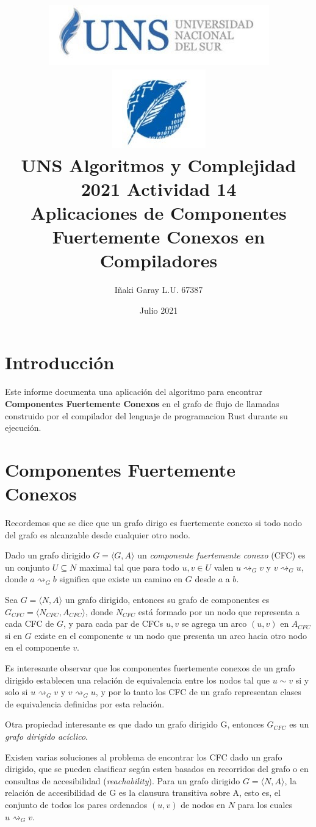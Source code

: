 \documentclass[12pt, a4paper]{article}
\title{
    \includegraphics[height=0.2\textwidth]{uns-logo}
    \includegraphics[height=0.2\textwidth]{dcic-logo} \\
    UNS Algoritmos y Complejidad 2021 Actividad 14 \\
    \large{Aplicaciones de Componentes Fuertemente Conexos en Compiladores}
    }
\author{Iñaki Garay L.U. 67387}
\date{Julio 2021}
\begin{document}
\maketitle


\section{Introducción}

Este informe documenta una aplicación del algoritmo para encontrar \textbf{Componentes Fuertemente Conexos} en el grafo de flujo de llamadas construido por el compilador del lenguaje de programacion Rust durante su ejecución.

\section{Componentes Fuertemente Conexos}

Recordemos que se dice que un grafo dirigo es fuertemente conexo si todo nodo del grafo es alcanzable desde cualquier otro nodo.

Dado un grafo dirigido $G = \langle G, A \rangle$ un \textit{componente fuertemente conexo} (CFC) es un conjunto $U \subseteq N$ maximal tal que para todo $u, v \in U$ valen $u \rightsquigarrow_{G} v$ y $v \rightsquigarrow_{G} u$, donde $a \rightsquigarrow_{G} b$ significa que existe un camino en $G$ desde $a$ a $b$.

Sea $G = \langle N,A \rangle$ un grafo dirigido, entonces su grafo de componentes es $G_{CFC} = \langle N_{CFC}, A_{CFC} \rangle$, donde $N_{CFC}$ está formado por un nodo que representa a cada CFC de $G$, y para cada par de CFCs $u, v$ se agrega un arco $(u,v)$ en $A_{CFC}$ si en $G$ existe en el componente $u$ un nodo que presenta un arco hacia otro nodo en el componente $v$.

Es interesante observar que los componentes fuertemente conexos de un grafo dirigido establecen una relación de equivalencia entre los nodos tal que $u \sim v$ si y solo si $u \rightsquigarrow_{G} v$ y $v \rightsquigarrow_{G} u$, y por lo tanto los CFC de un grafo representan clases de equivalencia definidas por esta relación.

Otra propiedad interesante es que dado un grafo dirigido G, entonces $G_{CFC}$ es un \textit{grafo dirigido acíclico}.

Existen varias soluciones al problema de encontrar los CFC dado un grafo dirigido, que se pueden clasificar según esten basados en recorridos del grafo o en consultas de accesibilidad (\textit{reachability}).
Para un grafo dirigido $G = \langle N, A \rangle$, la relación de accesibilidad de G es la clausura transitiva sobre A, esto es, el conjunto de todos los pares ordenados $(u, v)$ de nodos en $N$ para los cuales $u \rightsquigarrow_{G} v$.
\end{document}
